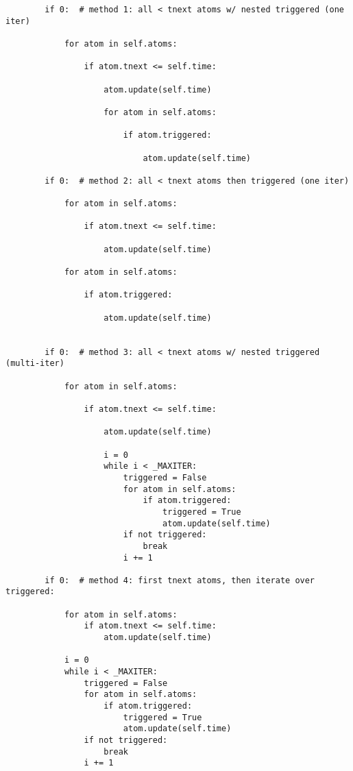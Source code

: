 \begin{lstlisting}
        if 0:  # method 1: all < tnext atoms w/ nested triggered (one iter)

            for atom in self.atoms:

                if atom.tnext <= self.time:

                    atom.update(self.time)

                    for atom in self.atoms:

                        if atom.triggered:

                            atom.update(self.time)

        if 0:  # method 2: all < tnext atoms then triggered (one iter)

            for atom in self.atoms:

                if atom.tnext <= self.time:

                    atom.update(self.time)

            for atom in self.atoms:

                if atom.triggered:

                    atom.update(self.time)


        if 0:  # method 3: all < tnext atoms w/ nested triggered (multi-iter)

            for atom in self.atoms:

                if atom.tnext <= self.time:

                    atom.update(self.time)

                    i = 0
                    while i < _MAXITER:
                        triggered = False
                        for atom in self.atoms:
                            if atom.triggered:
                                triggered = True
                                atom.update(self.time)
                        if not triggered:
                            break
                        i += 1

        if 0:  # method 4: first tnext atoms, then iterate over triggered:

            for atom in self.atoms:
                if atom.tnext <= self.time:
                    atom.update(self.time)

            i = 0
            while i < _MAXITER:
                triggered = False
                for atom in self.atoms:
                    if atom.triggered:
                        triggered = True
                        atom.update(self.time)
                if not triggered:
                    break
                i += 1


\end{lstlisting}
